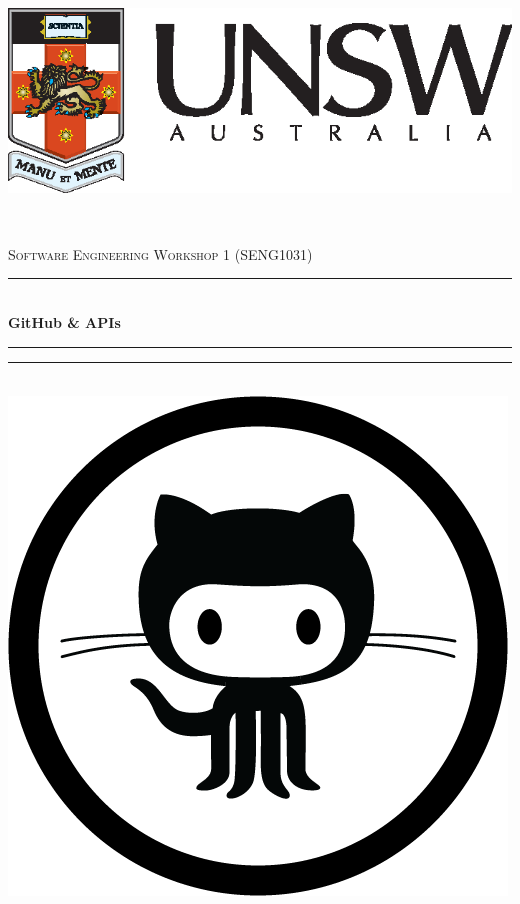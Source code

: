 \documentclass[12pt]{article}
\begin{document}
~\\[1cm]
\begin{center}
\includegraphics[scale=0.7]{landscapeColourPos.eps}
\end{center}
~\\[1cm]
\begin{center}

\textsc{\Large Software Engineering Workshop 1 (SENG1031)}\\[0.5cm]

\hrule $~$\\[0.4cm]
{ \huge \bfseries GitHub \& APIs\\[1cm]}
\hrule \hrule $~$\\[1.5cm]

\includegraphics[scale=0.2]{github_icon}~\\[1cm]


\end{center}
\end{document}

